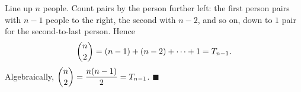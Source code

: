 Line up $n$ people. Count pairs by the person further left: the first person pairs with $n-1$ people to the right, the second with $n-2$, and so on, down to $1$ pair for the second-to-last person. Hence
\[
\dbinom n2=(n-1)+(n-2)+\dots+1=T_{n-1}.
\]
Algebraically, $\dbinom n2=\dfrac{n(n-1)}{2}=T_{n-1}$. $\blacksquare$
